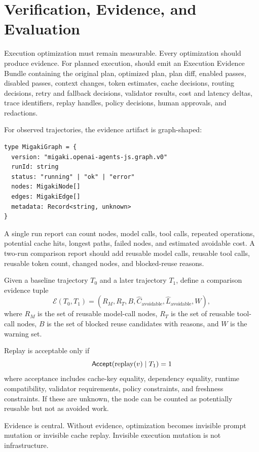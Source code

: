 \section{Verification, Evidence, and Evaluation}

Execution optimization must remain measurable. Every optimization should produce evidence. For planned execution, \migaki{} should emit an Execution Evidence Bundle containing the original plan, optimized plan, plan diff, enabled passes, disabled passes, context changes, token estimates, cache decisions, routing decisions, retry and fallback decisions, validator results, cost and latency deltas, trace identifiers, replay handles, policy decisions, human approvals, and redactions.

For observed trajectories, the evidence artifact is graph-shaped:

\begin{lstlisting}[language={}]
type MigakiGraph = {
  version: "migaki.openai-agents-js.graph.v0"
  runId: string
  status: "running" | "ok" | "error"
  nodes: MigakiNode[]
  edges: MigakiEdge[]
  metadata: Record<string, unknown>
}
\end{lstlisting}

A single run report can count nodes, model calls, tool calls, repeated operations, potential cache hits, longest paths, failed nodes, and estimated avoidable cost. A two-run comparison report should add reusable model calls, reusable tool calls, reusable token count, changed nodes, and blocked-reuse reasons.

Given a baseline trajectory $T_0$ and a later trajectory $T_1$, define a comparison evidence tuple
\begin{equation}
\mathcal{E}(T_0,T_1)=
(R_M, R_T, B, \widehat C_{\mathrm{avoidable}}, \widehat L_{\mathrm{avoidable}}, W),
\end{equation}
where $R_M$ is the set of reusable model-call nodes, $R_T$ is the set of reusable tool-call nodes, $B$ is the set of blocked reuse candidates with reasons, and $W$ is the warning set.

Replay is acceptable only if
\begin{equation}
\mathsf{Accept}(\mathrm{replay}(v) \mid T_1)=1
\end{equation}
where acceptance includes cache-key equality, dependency equality, runtime compatibility, validator requirements, policy constraints, and freshness constraints. If these are unknown, the node can be counted as potentially reusable but not as avoided work.

Evidence is central. Without evidence, optimization becomes invisible prompt mutation or invisible cache replay. Invisible execution mutation is not infrastructure.
